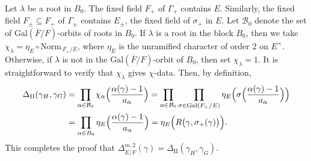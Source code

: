 \documentclass{amsart}
\begin{document}
Let $\lambda$ be a root in $B_0$.  The fixed field $F_+$ of $\Gamma_+$
contains $E$.  Similarly, the fixed field $F_\pm\subseteq F_+$
of $\Gamma_\pm$ contains $E_\pm$, the fixed field of $\sigma_+$ in 
$E$.  Let ${\mathcal B}_0$ denote the set of $\text{Gal}(\overline F/F)$-orbits
of roots in $B_0$. If $\lambda$ is a root in the block $B_0$, then we take
%
  $ \chi_{\lambda}  = \eta_E \circ \text{Norm}_{\, F_+/E} $, where
  $ \eta_E $ is
the unramified character of order 2 on $E^\times$. Otherwise, if
$\lambda$ is not in the $\text{Gal}(\overline F/F)$-orbit of $B_0$, then
set $\chi_\lambda=1$.
It is straightforward to verify that
  $ \chi_{\lambda} $
gives
  $ \chi $-data.
Then, by definition,
%
\begin{align*}
  \Delta_{\text{II}} (\gamma_H, \gamma_G)
  &=
  \prod_{\alpha\in{\mathcal B}_0}
  \chi_{\alpha}
  \Bigl(
    \frac
      { \alpha (\gamma)-1 }
      { a_{\alpha} }
  \Bigr)
=
  \prod_{\alpha\in{\mathcal B}_0}
  \prod_{\sigma \in \text{Gal}(F_+/E)}
  \eta_E
  \Bigl(
    \sigma
    \Bigl(
      \frac
        { \alpha (\gamma)-1 }
        { a_{\alpha} }
    \Bigr)
  \Bigr) 
\\
\vspace{10pt}
&=
  \prod_{\alpha\in B_0}
  \eta_E
  \Bigl(
    \frac
      { \alpha (\gamma)-1 }
      { a_{\alpha} }
  \Bigr) =
  \eta_E
  \Bigl(
    R \bigl( \gamma, \sigma_+ (\gamma) \bigr)
  \Bigr).
\end{align*}
%
This completes the proof that
  $ \Delta_{E/F}^{m,2} (\gamma) =
    \Delta_{\text{II}}
    (\gamma_H, \gamma_G) $.
\end{document}
